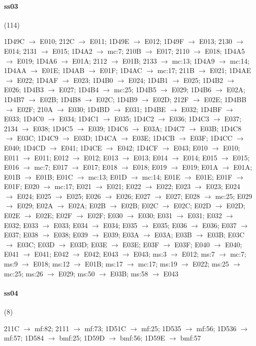 \paragraph{ss03} (114)
\raggedright\small 1D49C $\to$ E010; 212C $\to$ E011; 1D49E $\to$ E012; 1D49F
$\to$ E013; 2130 $\to$ E014; 2131 $\to$ E015; 1D4A2 $\to$ mc:7; 210B $\to$
E017; 2110 $\to$ E018; 1D4A5 $\to$ E019; 1D4A6 $\to$ E01A; 2112 $\to$ E01B;
2133 $\to$ mc:13; 1D4A9 $\to$ mc:14; 1D4AA $\to$ E01E; 1D4AB $\to$ E01F; 1D4AC
$\to$ mc:17; 211B $\to$ E021; 1D4AE $\to$ E022; 1D4AF $\to$ E023; 1D4B0 $\to$
E024; 1D4B1 $\to$ E025; 1D4B2 $\to$ E026; 1D4B3 $\to$ E027; 1D4B4 $\to$ mc:25;
1D4B5 $\to$ E029; 1D4B6 $\to$ E02A; 1D4B7 $\to$ E02B; 1D4B8 $\to$ E02C; 1D4B9
$\to$ E02D; 212F $\to$ E02E; 1D4BB $\to$ E02F; 210A $\to$ E030; 1D4BD $\to$
E031; 1D4BE $\to$ E032; 1D4BF $\to$ E033; 1D4C0 $\to$ E034; 1D4C1 $\to$ E035;
1D4C2 $\to$ E036; 1D4C3 $\to$ E037; 2134 $\to$ E038; 1D4C5 $\to$ E039; 1D4C6
$\to$ E03A; 1D4C7 $\to$ E03B; 1D4C8 $\to$ E03C; 1D4C9 $\to$ E03D; 1D4CA $\to$
E03E; 1D4CB $\to$ E03F; 1D4CC $\to$ E040; 1D4CD $\to$ E041; 1D4CE $\to$ E042;
1D4CF $\to$ E043; E010 $\to$ E010; E011 $\to$ E011; E012 $\to$ E012; E013 $\to$
E013; E014 $\to$ E014; E015 $\to$ E015; E016 $\to$ mc:7; E017 $\to$ E017; E018
$\to$ E018; E019 $\to$ E019; E01A $\to$ E01A; E01B $\to$ E01B; E01C $\to$
mc:13; E01D $\to$ mc:14; E01E $\to$ E01E; E01F $\to$ E01F; E020 $\to$ mc:17;
E021 $\to$ E021; E022 $\to$ E022; E023 $\to$ E023; E024 $\to$ E024; E025 $\to$
E025; E026 $\to$ E026; E027 $\to$ E027; E028 $\to$ mc:25; E029 $\to$ E029; E02A
$\to$ E02A; E02B $\to$ E02B; E02C $\to$ E02C; E02D $\to$ E02D; E02E $\to$ E02E;
E02F $\to$ E02F; E030 $\to$ E030; E031 $\to$ E031; E032 $\to$ E032; E033 $\to$
E033; E034 $\to$ E034; E035 $\to$ E035; E036 $\to$ E036; E037 $\to$ E037; E038
$\to$ E038; E039 $\to$ E039; E03A $\to$ E03A; E03B $\to$ E03B; E03C $\to$ E03C;
E03D $\to$ E03D; E03E $\to$ E03E; E03F $\to$ E03F; E040 $\to$ E040; E041 $\to$
E041; E042 $\to$ E042; E043 $\to$ E043; ms:3 $\to$ E012; ms:7 $\to$ mc:7; ms:9
$\to$ E018; ms:12 $\to$ E01B; ms:17 $\to$ mc:17; ms:19 $\to$ E022; ms:25 $\to$
mc:25; ms:26 $\to$ E029; ms:50 $\to$ E03B; ms:58 $\to$ E043\par

\paragraph{ss04} (8)
\raggedright\small 211C $\to$ mf:82; 2111 $\to$ mf:73; 1D51C $\to$ mf:25; 1D535
$\to$ mf:56; 1D536 $\to$ mf:57; 1D584 $\to$ bmf:25; 1D59D $\to$ bmf:56; 1D59E
$\to$ bmf:57\par

